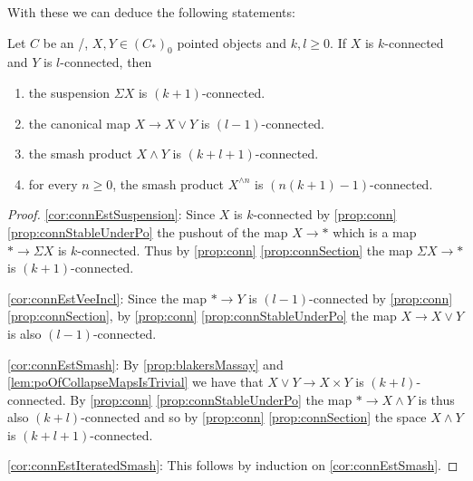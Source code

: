 With these we can deduce the following statements:
\begin{corollary}\label{cor:connEst}
    Let $C$ be an \inftytop/, $X,Y\in \left(C_*\right)_0$ pointed objects and $k,l\geq 0$. 
    If $X$ is $k$-connected and $Y$ is $l$-connected, then
    \begin{enumerate}[label={(\roman*)}]
        \item the suspension $\Sigma X$ is $(k+1)$-connected. \label{cor:connEstSuspension}
        \item the canonical map $X\to X\vee Y$ is $(l-1)$-connected. \label{cor:connEstVeeIncl}
        \item the smash product $X\wedge Y$ is $(k + l + 1)$-connected. \label{cor:connEstSmash}
        \item for every $n\geq 0$, the smash product $X^{\wedge n}$ is $(n(k+1)-1)$-connected. \label{cor:connEstIteratedSmash}
    \end{enumerate}
    \begin{proof}
        \ref{cor:connEstSuspension}: Since $X$ is $k$-connected by \cref{prop:conn} \ref{prop:connStableUnderPo} the pushout of the map $X\to *$ which is a map $*\to \Sigma X$ is $k$-connected.
        Thus by \cref{prop:conn} \ref{prop:connSection} the map $\Sigma X\to *$ is $(k+1)$-connected.

        \ref{cor:connEstVeeIncl}: Since the map $*\to Y$ is $(l-1)$-connected by \cref{prop:conn} \ref{prop:connSection}, by \cref{prop:conn} \ref{prop:connStableUnderPo} the map $X\to X\vee Y$ is also $(l-1)$-connected.
        
        \ref{cor:connEstSmash}: By \cref{prop:blakersMassay} and \cref{lem:poOfCollapseMapsIsTrivial} we have that $X\vee Y\to X\times Y$ is  $(k+l)$-connected. 
        By \cref{prop:conn} \ref{prop:connStableUnderPo} the map $*\to X\wedge Y$ is thus also $(k+l)$-connected and so by \cref{prop:conn} \ref{prop:connSection} the space $X\wedge Y$ is $(k+l+1)$-connected.

        \ref{cor:connEstIteratedSmash}: This follows by induction on \ref{cor:connEstSmash}.
    \end{proof}
\end{corollary}
